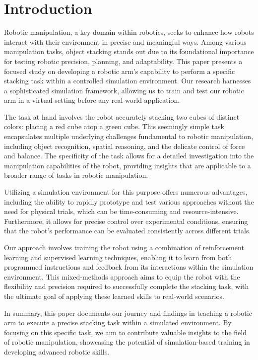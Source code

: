 \documentclass[../report.tex]{subfiles}
\begin{document}
    \section{Introduction}
    \label{sec:introduction}

    Robotic manipulation, a key domain within robotics, seeks to enhance how robots interact with their environment in precise and meaningful ways. Among various manipulation tasks, object stacking stands out due to its foundational importance for testing robotic precision, planning, and adaptability. This paper presents a focused study on developing a robotic arm's capability to perform a specific stacking task within a controlled simulation environment. Our research harnesses a sophisticated simulation framework, allowing us to train and test our robotic arm in a virtual setting before any real-world application.

    The task at hand involves the robot accurately stacking two cubes of distinct colors: placing a red cube atop a green cube. This seemingly simple task encapsulates multiple underlying challenges fundamental to robotic manipulation, including object recognition, spatial reasoning, and the delicate control of force and balance. The specificity of the task allows for a detailed investigation into the manipulation capabilities of the robot, providing insights that are applicable to a broader range of tasks in robotic manipulation.
    
    Utilizing a simulation environment for this purpose offers numerous advantages, including the ability to rapidly prototype and test various approaches without the need for physical trials, which can be time-consuming and resource-intensive. Furthermore, it allows for precise control over experimental conditions, ensuring that the robot's performance can be evaluated consistently across different trials.
    
    Our approach involves training the robot using a combination of reinforcement learning and supervised learning techniques, enabling it to learn from both programmed instructions and feedback from its interactions within the simulation environment. This mixed-methods approach aims to equip the robot with the flexibility and precision required to successfully complete the stacking task, with the ultimate goal of applying these learned skills to real-world scenarios.
    
    In summary, this paper documents our journey and findings in teaching a robotic arm to execute a precise stacking task within a simulated environment. By focusing on this specific task, we aim to contribute valuable insights to the field of robotic manipulation, showcasing the potential of simulation-based training in developing advanced robotic skills.
\end{document}
